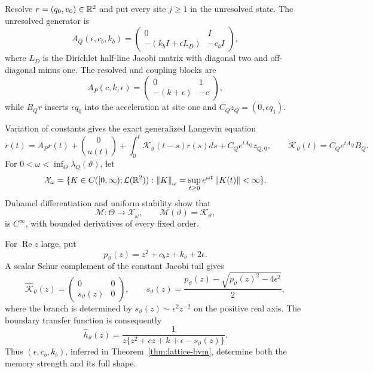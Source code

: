 Resolve \(r=(q_0,v_0)\in\mathbb R^2\) and put every site \(j\ge1\) in the unresolved
state.  The unresolved generator is
\[
 A_Q(\epsilon,c_b,k_b)
 =\begin{pmatrix}0&I\\-(k_bI+\epsilon L_D)&-c_bI\end{pmatrix},
\]
where \(L_D\) is the Dirichlet half-line Jacobi matrix with diagonal two and
off-diagonal minus one.  The resolved and coupling blocks are
\[
 A_P(c,k,\epsilon)=
 \begin{pmatrix}0&1\\-(k+\epsilon)&-c\end{pmatrix},
\]
while \(B_Qr\) inserts \(\epsilon q_0\) into the acceleration at site one and
\(C_Qz_Q=(0,\epsilon q_1)\).

Variation of constants gives the exact generalized Langevin equation
\begin{equation}
 \dot r(t)=A_Pr(t)+\binom0{u(t)}
 +\int_0^t\mathcal K_\vartheta(t-s)r(s)ds
 +C_Qe^{tA_Q}z_{Q,0},
 \qquad
 \mathcal K_\vartheta(t)=C_Qe^{tA_Q}B_Q.
 \label{eq:gle}
\end{equation}
For \(0<\omega<\inf_\Theta\lambda_Q(\vartheta)\), let
\[
 \mathcal X_\omega=\{K\in C([0,\infty);\mathcal L(\mathbb R^2)):
 \left\|K\right\|_\omega=\sup_{t\ge0}e^{\omega t}\left\|K(t)\right\|<\infty\}.
\]
Duhamel differentiation and uniform stability show that
\begin{equation}
 \mathscr M:\Theta\to\mathcal X_\omega,\qquad
 \mathscr M(\vartheta)=\mathcal K_\vartheta,
 \label{eq:memory-map}
\end{equation}
is \(C^\infty\), with bounded derivatives of every fixed order.

For \(\operatorname{Re}z\) large, put
\[
 p_\vartheta(z)=z^2+c_bz+k_b+2\epsilon.
\]
A scalar Schur complement of the constant Jacobi tail gives
\begin{equation}
 \widehat{\mathcal K}_\vartheta(z)=
 \begin{pmatrix}0&0\\s_\vartheta(z)&0\end{pmatrix},
 \qquad
 s_\vartheta(z)=
 \frac{p_\vartheta(z)-
 \sqrt{p_\vartheta(z)^2-4\epsilon^2}}2,
 \label{eq:memory-transform}
\end{equation}
where the branch is determined by
\(s_\vartheta(z)\sim\epsilon^2z^{-2}\) on the positive real axis.  The
boundary transfer function is consequently
\begin{equation}
 \widehat h_\vartheta(z)=
 \frac1{z\{z^2+cz+k+\epsilon-s_\vartheta(z)\}}.
 \label{eq:boundary-transfer}
\end{equation}
Thus \((\epsilon,c_b,k_b)\), inferred in
Theorem~\ref{thm:lattice-bvm}, determine both the memory strength and its full
shape.

